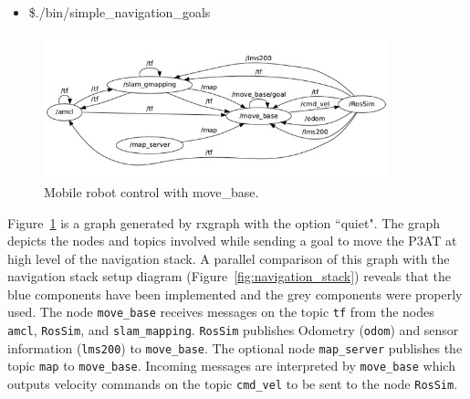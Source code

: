 \begin{itemize}
\item[]\$./bin/simple\_navigation\_goals
\end{itemize}

\begin{figure}[h!]
\centering
\includegraphics[width=10cm]{Figures/Misc/move_base.jpg}
\caption{Mobile robot control with move\_base.}\label{fig:movebase}
\end{figure}

Figure~\ref{fig:movebase} is a graph generated by rxgraph with the option ``quiet". The graph depicts the nodes and topics involved while sending a goal to move the P3AT at high level of the navigation stack. A parallel comparison of this graph with the navigation stack setup diagram (Figure~\ref{fig:navigation_stack}) reveals that the blue components have been implemented and the grey components were properly used. The node \texttt{move\_base} receives messages on the topic \texttt{tf} from the nodes \texttt{amcl}, \texttt{RosSim}, and \texttt{slam\_mapping}. \texttt{RosSim} publishes Odometry (\texttt{odom}) and sensor information (\texttt{lms200}) to \texttt{move\_base}. The optional node \texttt{map\_server} publishes the topic \texttt{map} to \texttt{move\_base}. Incoming messages are interpreted by \texttt{move\_base} which outputs velocity commands on the topic \texttt{cmd\_vel} to be sent to the node \texttt{RosSim}.
